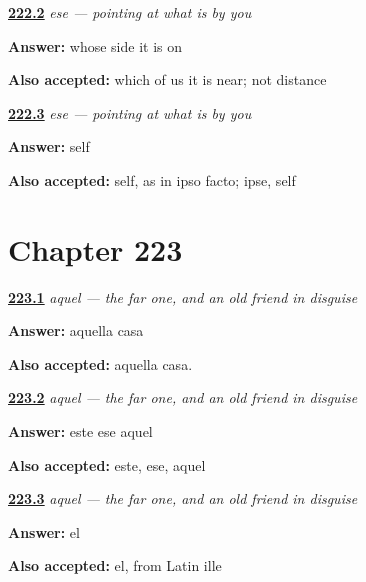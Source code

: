 \noindent\begin{minipage}[t]{\linewidth}
\raggedright
\hyperlink{review-ES-C59-ese-contrast}{\textbf{222.2}} \emph{ese — pointing at what is by you}\par
\small \textbf{Answer:} whose side it is on\par
\footnotesize \textbf{Also accepted:} which of us it is near; not distance
\end{minipage}\par\medskip

\noindent\begin{minipage}[t]{\linewidth}
\raggedright
\hyperlink{review-ES-C59-ese-origin}{\textbf{222.3}} \emph{ese — pointing at what is by you}\par
\small \textbf{Answer:} self\par
\footnotesize \textbf{Also accepted:} self, as in ipso facto; ipse, self
\end{minipage}\par\medskip

\section*{Chapter 223}

\noindent\begin{minipage}[t]{\linewidth}
\raggedright
\hyperlink{review-ES-C59-aquel-say}{\textbf{223.1}} \emph{aquel — the far one, and an old friend in disguise}\par
\small \textbf{Answer:} aquella casa\par
\footnotesize \textbf{Also accepted:} aquella casa.
\end{minipage}\par\medskip

\noindent\begin{minipage}[t]{\linewidth}
\raggedright
\hyperlink{review-ES-C59-aquel-three}{\textbf{223.2}} \emph{aquel — the far one, and an old friend in disguise}\par
\small \textbf{Answer:} este ese aquel\par
\footnotesize \textbf{Also accepted:} este, ese, aquel
\end{minipage}\par\medskip

\noindent\begin{minipage}[t]{\linewidth}
\raggedright
\hyperlink{review-ES-C59-aquel-ille}{\textbf{223.3}} \emph{aquel — the far one, and an old friend in disguise}\par
\small \textbf{Answer:} el\par
\footnotesize \textbf{Also accepted:} el, from Latin ille
\end{minipage}\par\medskip

